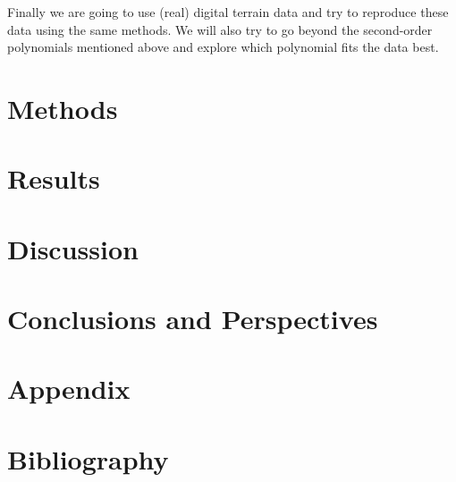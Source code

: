 \documentclass[%
oneside,                 %
final,                   %
11pt,
titlepage,
english]{article}
\begin{document}
	Finally we are going to use (real) digital terrain data and try to
	reproduce these data using the same methods. We will also try to go
	beyond the second-order polynomials mentioned above and explore 
	which polynomial fits the data best.
	
	\section*{Methods}
	
	\section*{Results}
	
	\section*{Discussion}
	
	\section*{Conclusions and Perspectives}
	
	\section*{Appendix}
	
	\section*{Bibliography}
	
\end{document}
